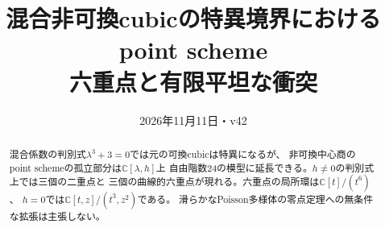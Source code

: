 \documentclass[a4paper,11pt]{ltjsarticle}
\title{混合非可換cubicの特異境界におけるpoint scheme\\\large 六重点と有限平坦な衝突}
\author{}\date{2026年11月11日・v42}
\theoremstyle{remark}\newtheorem{remark}[theorem]{注意}
\begin{document}
\maketitle
\begin{abstract}
混合係数の判別式$\lambda^3+3=0$では元の可換cubicは特異になるが、
非可換中心商のpoint schemeの孤立部分は$\mathbb C[\lambda,h]$上
自由階数24の模型に延長できる。$h\ne0$の判別式上では三個の二重点と
三個の曲線的六重点が現れる。六重点の局所環は$\mathbb C[t]/(t^6)$、
$h=0$では$\mathbb C[t,z]/(t^3,z^2)$である。
滑らかなPoisson多様体の零点定理への無条件な拡張は主張しない。
\end{abstract}

\end{document}
